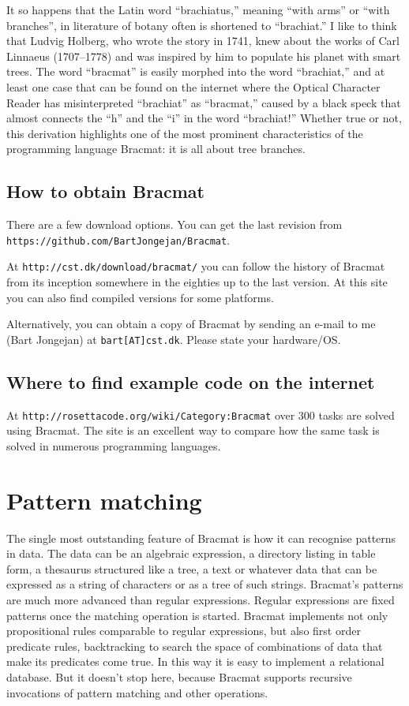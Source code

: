 \documentclass[12pt]{article}
\begin{document}
It so happens that the Latin word ``brachiatus,'' meaning ``with
arms'' or ``with branches'', in literature of botany often is
shortened to ``brachiat.'' I like to think that Ludvig Holberg, who
wrote the story in 1741, knew about the works of Carl Linnaeus
(1707--1778) and was inspired by him to populate his planet with smart
trees. The word ``bracmat'' is easily morphed into the word
``brachiat,'' and at least one case that can be found on the
internet where the Optical Character Reader has misinterpreted
``brachiat'' as ``bracmat,'' caused by a black speck that almost connects
the ``h'' and the ``i'' in the word ``brachiat!'' Whether true or not, this
derivation highlights one of the most prominent characteristics of the
programming language Bracmat: it is all about tree branches.

\subsection{How to obtain Bracmat}

There are a few download options. You can get the last revision from
\texttt{https://github.com/\allowbreak{}BartJongejan/\allowbreak{}Bracmat}.

At \texttt{http://cst.dk/download/bracmat/} you can follow the history
of Bracmat from its inception somewhere in the eighties up to the last
version. At this site you can also find compiled versions for some
platforms.

Alternatively, you can obtain a copy of Bracmat by sending an e-mail
to me (Bart Jongejan) at \texttt{bart[AT]cst.dk}. Please state your
hardware/OS.

\subsection{Where to find example code on the internet}

At \texttt{http://rosettacode.org/wiki/Category:Bracmat} over 300
tasks are solved using Bracmat. The site is an excellent way to
compare how the same task is solved in numerous programming
languages.

\section{Pattern matching}

The single most outstanding feature of Bracmat is how it can recognise
patterns in data. The data can be an algebraic expression, a directory
listing in table form, a thesaurus structured like a tree, a text or
whatever data that can be expressed as a string of characters or as a
tree of such strings. Bracmat's patterns are much more advanced than
regular expressions. Regular expressions are fixed patterns once the
matching operation is started. Bracmat implements not only
propositional rules comparable to regular expressions, but also first
order predicate rules, backtracking to search the space of
combinations of data that make its predicates come true. In this way
it is easy to implement a relational database. But it doesn't
stop here, because Bracmat supports recursive invocations of pattern
matching and other operations.
\end{document}
